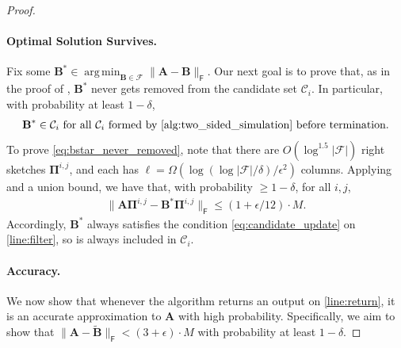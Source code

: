 \documentclass{article}[11pt]
\theoremstyle{definition}
\newcommand{\bv}[1]{\boldsymbol{\mathbf{#1}}}
\newcommand{\Fro}{\mathsf{F}}
\newcommand{\F}{\mathcal{F}}
\DeclareMathOperator*{\argmin}{arg\,min}
\begin{document}
\begin{proof}
        \paragraph{Optimal Solution Survives.}
        Fix some $\bv{B}^* \in \argmin_{\bv{B}\in \mathcal{F}} \|\bv{A} - \bv{B}\|_\Fro$. Our next goal is to prove that, as in the proof of , $\bv{B}^*$ never gets removed from the candidate set $\mathcal{C}_i$. In particular, with probability at least $1-\delta$, 
        \begin{align}
            \label{eq:bstar_never_removed}
    \bv{B}^* \in \mathcal{C}_i \text{ for all } \mathcal{C}_i\text{ formed by \Cref{alg:two_sided_simulation} before termination.}
        \end{align} 
%
        To prove \eqref{eq:bstar_never_removed}, note that there are $O(\log^{1.5}|\F|)$ right sketches $\bv{\Pi}^{i,j}$, and each has $\ell = \Omega\left(\log(\log|\F|/\delta)/\epsilon^2\right)$ columns. Applying  and a union bound, we have that, with probability $\geq 1-\delta$, for all $i,j$, 
        \begin{align}
            \label{eq:norm_of_bstar}
        \|\bv{A}\bv{\Pi}^{i,j} - \bv{B}^*\bv{\Pi}^{i,j}\|_\Fro \leq (1+\epsilon/12) \cdot M.
        \end{align}
        Accordingly, $\bv{B}^*$ always satisfies the condition \eqref{eq:candidate_update} on \cref{line:filter}, so is always included in $\mathcal{C}_{i}$. 


        \paragraph{Accuracy.}
        We now show that whenever the algorithm returns an output on \cref{line:return}, it is an accurate approximation to $\bv{A}$ with high probability. Specifically, we aim to show that $\|\bv{A} - \bv{\tilde B}\|_\Fro < (3+\epsilon)\cdot M$ with probability at least $1-\delta$.


\end{proof}
\end{document}
